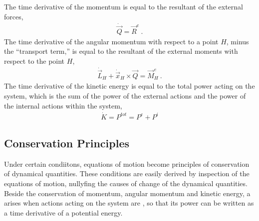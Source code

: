 \documentclass[letterpaper,10pt,english]{jupyterBook}
\begin{document}
\sphinxAtStartPar
{} The time derivative of the momentum is equal to the resultant of the external forces,
\begin{equation}\label{equation:ch/dynamics-eom:principle:q}
\begin{split}\dot{\vec{Q}} = \vec{R}^e \ .\end{split}
\end{equation}
\sphinxAtStartPar
{} The time derivative of the angular momentum with respect to a point \(H\), minus the “transport term,” is equal to the resultant of the external moments with respect to the point \(H\),
\begin{equation}\label{equation:ch/dynamics-eom:principle:l}
\begin{split}\dot{\vec{L}}_H + \dot{\vec{x}}_H \times \vec{Q} = \vec{M}_H^e \ .\end{split}
\end{equation}
\sphinxAtStartPar
{} The time derivative of the kinetic energy is equal to the total power acting on the system, which is the sum of the power of the external actions and the power of the internal actions within the system,
\begin{equation}\label{equation:ch/dynamics-eom:principle:k}
\begin{split}\dot{K} = P^{tot} = P^e + P^i\end{split}
\end{equation}

\subsection{Conservation Principles}
\label{\detokenize{ch/dynamics-eom:conservation-principles}}\label{\detokenize{ch/dynamics-eom:classical-mechanics-dynamics-eom-conservation}}
\sphinxAtStartPar
Under certain condiitons, equations of motion become principles of conservation of dynamical quantities. These conditions are easily derived by inspection of the equations of motion, nullyfing the causes of change of the dynamical quantities. Beside the conservation of momentum, angular momentum and kinetic energy, a  arises when actions acting on the system are {\hyperref[\detokenize{ch/actions-conservative:classical-mechanics-actions-conservative}]{}}, so that its power can be written as a time derivative of a potential energy.
\end{document}

